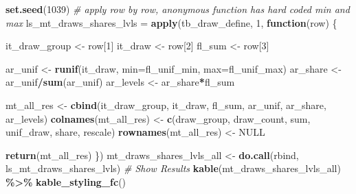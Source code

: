 \documentclass[
]{book}
\newenvironment{Shaded}{\begin{snugshade}}{\end{snugshade}}
\newcommand{\CommentTok}[1]{\textcolor[rgb]{0.56,0.35,0.01}{\textit{#1}}}
\newcommand{\ControlFlowTok}[1]{\textcolor[rgb]{0.13,0.29,0.53}{\textbf{#1}}}
\newcommand{\DataTypeTok}[1]{\textcolor[rgb]{0.13,0.29,0.53}{#1}}
\newcommand{\DecValTok}[1]{\textcolor[rgb]{0.00,0.00,0.81}{#1}}
\newcommand{\KeywordTok}[1]{\textcolor[rgb]{0.13,0.29,0.53}{\textbf{#1}}}
\newcommand{\NormalTok}[1]{#1}
\newcommand{\OperatorTok}[1]{\textcolor[rgb]{0.81,0.36,0.00}{\textbf{#1}}}
\newcommand{\OtherTok}[1]{\textcolor[rgb]{0.56,0.35,0.01}{#1}}
\newcommand{\StringTok}[1]{\textcolor[rgb]{0.31,0.60,0.02}{#1}}
\begin{document}
\begin{Shaded}
\begin{Highlighting}[]
\KeywordTok{set.seed}\NormalTok{(}\DecValTok{1039}\NormalTok{)}
\CommentTok{\# apply row by row, anonymous function has hard coded min and max}
\NormalTok{ls\_mt\_draws\_shares\_lvls =}
\StringTok{  }\KeywordTok{apply}\NormalTok{(tb\_draw\_define, }\DecValTok{1}\NormalTok{, }\ControlFlowTok{function}\NormalTok{(row) \{}

\NormalTok{    it\_draw\_group \textless{}{-}}\StringTok{ }\NormalTok{row[}\DecValTok{1}\NormalTok{]}
\NormalTok{    it\_draw \textless{}{-}}\StringTok{ }\NormalTok{row[}\DecValTok{2}\NormalTok{]}
\NormalTok{    fl\_sum \textless{}{-}}\StringTok{ }\NormalTok{row[}\DecValTok{3}\NormalTok{]}

\NormalTok{    ar\_unif \textless{}{-}}\StringTok{ }\KeywordTok{runif}\NormalTok{(it\_draw,}
                     \DataTypeTok{min=}\NormalTok{fl\_unif\_min,}
                     \DataTypeTok{max=}\NormalTok{fl\_unif\_max)}
\NormalTok{    ar\_share \textless{}{-}}\StringTok{ }\NormalTok{ar\_unif}\OperatorTok{/}\KeywordTok{sum}\NormalTok{(ar\_unif)}
\NormalTok{    ar\_levels \textless{}{-}}\StringTok{ }\NormalTok{ar\_share}\OperatorTok{*}\NormalTok{fl\_sum}

\NormalTok{    mt\_all\_res \textless{}{-}}\StringTok{ }\KeywordTok{cbind}\NormalTok{(it\_draw\_group, it\_draw, fl\_sum,}
\NormalTok{                        ar\_unif, ar\_share, ar\_levels)}
    \KeywordTok{colnames}\NormalTok{(mt\_all\_res) \textless{}{-}}
\StringTok{      }\KeywordTok{c}\NormalTok{(}\StringTok{\textquotesingle{}draw\_group\textquotesingle{}}\NormalTok{, }\StringTok{\textquotesingle{}draw\_count\textquotesingle{}}\NormalTok{, }\StringTok{\textquotesingle{}sum\textquotesingle{}}\NormalTok{,}
        \StringTok{\textquotesingle{}unif\_draw\textquotesingle{}}\NormalTok{, }\StringTok{\textquotesingle{}share\textquotesingle{}}\NormalTok{, }\StringTok{\textquotesingle{}rescale\textquotesingle{}}\NormalTok{)}
    \KeywordTok{rownames}\NormalTok{(mt\_all\_res) \textless{}{-}}\StringTok{ }\OtherTok{NULL}

    \KeywordTok{return}\NormalTok{(mt\_all\_res)}
\NormalTok{  \})}
\NormalTok{mt\_draws\_shares\_lvls\_all \textless{}{-}}\StringTok{ }\KeywordTok{do.call}\NormalTok{(rbind, ls\_mt\_draws\_shares\_lvls)}
\CommentTok{\# Show Results}
\KeywordTok{kable}\NormalTok{(mt\_draws\_shares\_lvls\_all) }\OperatorTok{\%\textgreater{}\%}\StringTok{ }\KeywordTok{kable\_styling\_fc}\NormalTok{()}
\end{Highlighting}
\end{Shaded}
\end{document}
